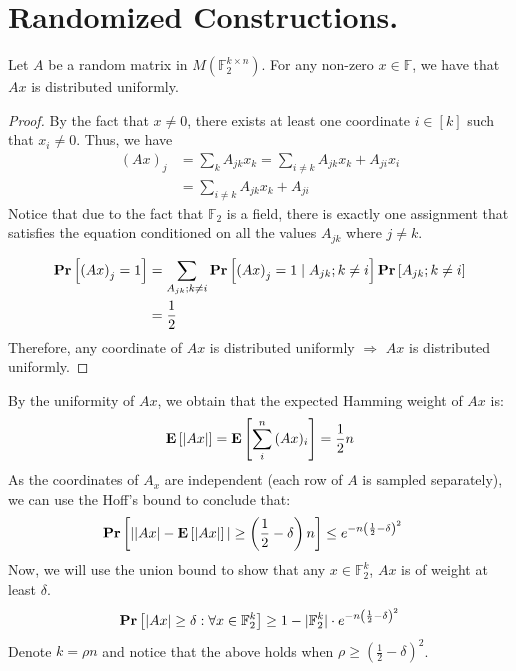   \section{Randomized Constructions.}
\begin{claim}
Let $A$ be a random matrix in $M(\mathbb{F}_{2}^{k\times n})$. For any non-zero $x \in \mathbb{F}$, we have that $Ax$ is distributed uniformly.
\end{claim}
\begin{proof}
By the fact that $x \neq 0$, there exists at least one coordinate $i \in [k]$ such that $x_i \neq 0$. Thus, we have
\begin{equation*}
    \begin{split}    
        \left( Ax \right)_{j} &= \sum_{k}{A_{jk}x_{k}} = \sum_{i \neq k}{A_{jk}x_{k}}  + A_{ji}x_{i} \\ 
        & =  \sum_{i \neq k}{A_{jk}x_{k}}  + A_{ji}
      \end{split}
\end{equation*}
Notice that due to the fact that $\mathbb{F}_{2}$ is a field, there is exactly one assignment that satisfies the equation conditioned on all the values $A_{jk}$ where $j \neq k$.    

\begin{equation*}
    \begin{split}
      \mathbf{Pr} \left[ {\left( Ax \right)_{j} = 1} \right] &=  \sum_{ A_{jk}; k\neq i   }{\mathbf{Pr} \left[ {\left( Ax \right)_{j} = 1 \mid A_{jk} ; k\neq i } \right]\mathbf{Pr} \left[ { A_{jk} ; k\neq i } \right]}  \\
      &= \frac{1}{2} 
    \end{split}
\end{equation*}
Therefore, any coordinate of $Ax$ is distributed uniformly $\Rightarrow$ $Ax$ is distributed uniformly. 
\end{proof}
By the uniformity of $Ax$, we obtain that the expected Hamming weight of $Ax$ is: 
\begin{equation*}
  \begin{split}
    \mathbf{E} \left[ {|Ax| } \right] = \mathbf{E} \left[ {\sum_{i}^{n}{(Ax)_{i}}} \right] = \frac{1}{2} n    
  \end{split}
\end{equation*} 
As the coordinates of $A_{x}$ are independent (each row of $A$ is sampled separately), we can use the Hoff's bound to conclude that: 
\begin{equation*}
  \begin{split}
    \mathbf{Pr} \left[ {| |Ax| - \mathbf{E} \left[ {|Ax|} \right]| \ge \left(\frac{1}{2} - \delta \right) n } \right] & \le e^{-n \left(\frac{1}{2} - \delta \right)^{2} } 
  \end{split}
\end{equation*}
Now, we will use the union bound to show that any $x \in \mathbb{F}_{2}^{k}$, $Ax$ is of weight at least $\delta$.  
\begin{equation*}
  \begin{split}
    \mathbf{Pr} \left[ {|Ax| \ge \delta : \forall x \in \mathbb{F}_{2}^{k} } \right] \ge 1 - |\mathbb{F}_{2}^{k}| \cdot e^{-n \left(\frac{1}{2} - \delta \right)^{2} } 
  \end{split}
\end{equation*}
Denote $k = \rho n$ and notice that the above holds when $\rho \ge \left(\frac{1}{2} - \delta \right)^{2} $.  

